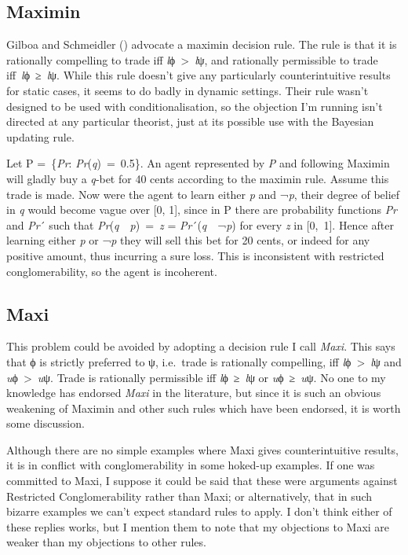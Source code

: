 \documentclass[
  10pt,
  letterpaper,
  DIV=11,
  numbers=noendperiod,
  twoside]{scrartcl}
\begin{document}
\subsection{Maximin}\label{maximin}

Gilboa and Schmeidler ()
advocate a maximin decision rule. The rule is that it is rationally
compelling to trade iff \emph{l}ϕ~\textgreater~\emph{l}ψ, and rationally
permissible to trade iff~\emph{l}ϕ~≥~\emph{l}ψ. While this rule doesn't
give any particularly counterintuitive results for static cases, it
seems to do badly in dynamic settings. Their rule wasn't designed to be
used with conditionalisation, so the objection I'm running isn't
directed at any particular theorist, just at its possible use with the
Bayesian updating rule.

Let P =~\{\emph{Pr}: \emph{Pr}(\emph{q})~=~0.5\}. An agent represented
by \emph{P} and following Maximin will gladly buy a \emph{q}‑bet for 40
cents according to the maximin rule. Assume this trade is made. Now were
the agent to learn either \emph{p} and ¬\emph{p}, their degree of belief
in \emph{q} would become vague over {[}0, 1{]}, since in P there are
probability functions \emph{Pr} and \emph{Pr}´ such that
\emph{Pr}(\emph{q}~\textbar~\emph{p})~=~\emph{z} =
\emph{Pr}´(\emph{q}~\textbar~¬\emph{p}) for every \emph{z} in
{[}0,~1{]}. Hence after learning either \emph{p} or ¬\emph{p} they will
sell this bet for 20 cents, or indeed for any positive amount, thus
incurring a sure loss. This is inconsistent with restricted
conglomerability, so the agent is incoherent.

\subsection{Maxi}\label{maxi}

This problem could be avoided by adopting a decision rule I call
\emph{Maxi}. This says that ϕ is strictly preferred to ψ, i.e.~trade is
rationally compelling, iff \emph{l}ϕ~\textgreater~\emph{l}ψ and
\emph{u}ϕ~\textgreater~\emph{u}ψ. Trade is rationally permissible iff
\emph{l}ϕ~≥~\emph{l}ψ or \emph{u}ϕ~≥~\emph{u}ψ. No one to my knowledge
has endorsed \emph{Maxi} in the literature, but since it is such an
obvious weakening of Maximin and other such rules which have been
endorsed, it is worth some discussion.

Although there are no simple examples where Maxi gives counterintuitive
results, it is in conflict with conglomerability in some hoked-up
examples. If one was committed to Maxi, I suppose it could be said that
these were arguments against Restricted Conglomerability rather than
Maxi; or alternatively, that in such bizarre examples we can't expect
standard rules to apply. I don't think either of these replies works,
but I mention them to note that my objections to Maxi are weaker than my
objections to other rules.
\end{document}
